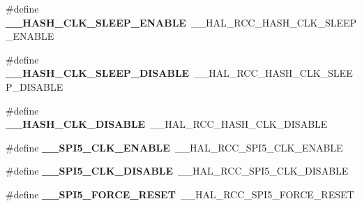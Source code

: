 \begin{DoxyCompactItemize}
\item 
\hypertarget{group___h_a_l___r_c_c___aliased_gae9acd455370cd79310252130c349f838}{\#define {\bfseries \-\_\-\-\_\-\-H\-A\-S\-H\-\_\-\-C\-L\-K\-\_\-\-S\-L\-E\-E\-P\-\_\-\-E\-N\-A\-B\-L\-E}~\-\_\-\-\_\-\-H\-A\-L\-\_\-\-R\-C\-C\-\_\-\-H\-A\-S\-H\-\_\-\-C\-L\-K\-\_\-\-S\-L\-E\-E\-P\-\_\-\-E\-N\-A\-B\-L\-E}\label{group___h_a_l___r_c_c___aliased_gae9acd455370cd79310252130c349f838}

\item 
\hypertarget{group___h_a_l___r_c_c___aliased_ga1e1531b67894be54ccf3e76229a96e68}{\#define {\bfseries \-\_\-\-\_\-\-H\-A\-S\-H\-\_\-\-C\-L\-K\-\_\-\-S\-L\-E\-E\-P\-\_\-\-D\-I\-S\-A\-B\-L\-E}~\-\_\-\-\_\-\-H\-A\-L\-\_\-\-R\-C\-C\-\_\-\-H\-A\-S\-H\-\_\-\-C\-L\-K\-\_\-\-S\-L\-E\-E\-P\-\_\-\-D\-I\-S\-A\-B\-L\-E}\label{group___h_a_l___r_c_c___aliased_ga1e1531b67894be54ccf3e76229a96e68}

\item 
\hypertarget{group___h_a_l___r_c_c___aliased_gab3f5c7465d76625b7f6150aceec5780e}{\#define {\bfseries \-\_\-\-\_\-\-H\-A\-S\-H\-\_\-\-C\-L\-K\-\_\-\-D\-I\-S\-A\-B\-L\-E}~\-\_\-\-\_\-\-H\-A\-L\-\_\-\-R\-C\-C\-\_\-\-H\-A\-S\-H\-\_\-\-C\-L\-K\-\_\-\-D\-I\-S\-A\-B\-L\-E}\label{group___h_a_l___r_c_c___aliased_gab3f5c7465d76625b7f6150aceec5780e}

\item 
\hypertarget{group___h_a_l___r_c_c___aliased_gab2da9ccd3f940c93df709920900fba25}{\#define {\bfseries \-\_\-\-\_\-\-S\-P\-I5\-\_\-\-C\-L\-K\-\_\-\-E\-N\-A\-B\-L\-E}~\-\_\-\-\_\-\-H\-A\-L\-\_\-\-R\-C\-C\-\_\-\-S\-P\-I5\-\_\-\-C\-L\-K\-\_\-\-E\-N\-A\-B\-L\-E}\label{group___h_a_l___r_c_c___aliased_gab2da9ccd3f940c93df709920900fba25}

\item 
\hypertarget{group___h_a_l___r_c_c___aliased_ga5b165d3539afb51e2e05bd2de0749ae3}{\#define {\bfseries \-\_\-\-\_\-\-S\-P\-I5\-\_\-\-C\-L\-K\-\_\-\-D\-I\-S\-A\-B\-L\-E}~\-\_\-\-\_\-\-H\-A\-L\-\_\-\-R\-C\-C\-\_\-\-S\-P\-I5\-\_\-\-C\-L\-K\-\_\-\-D\-I\-S\-A\-B\-L\-E}\label{group___h_a_l___r_c_c___aliased_ga5b165d3539afb51e2e05bd2de0749ae3}

\item 
\hypertarget{group___h_a_l___r_c_c___aliased_ga58137bdc1c2d10e75f0da96c677e8ead}{\#define {\bfseries \-\_\-\-\_\-\-S\-P\-I5\-\_\-\-F\-O\-R\-C\-E\-\_\-\-R\-E\-S\-E\-T}~\-\_\-\-\_\-\-H\-A\-L\-\_\-\-R\-C\-C\-\_\-\-S\-P\-I5\-\_\-\-F\-O\-R\-C\-E\-\_\-\-R\-E\-S\-E\-T}\label{group___h_a_l___r_c_c___aliased_ga58137bdc1c2d10e75f0da96c677e8ead}


\end{DoxyCompactItemize}
